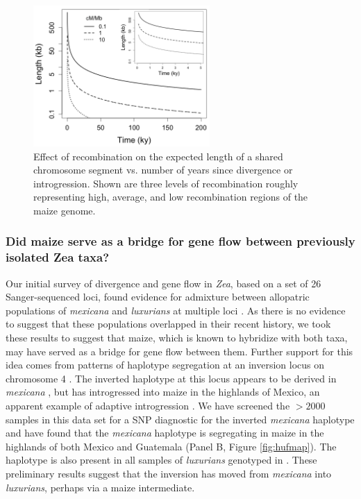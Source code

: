 \begin{figure}
  \centering
   \includegraphics[width=0.6\textwidth]{length_vs_time2}
    \caption{Effect of recombination on the expected length of a shared chromosome segment vs. number of years since divergence or introgression.  Shown are three levels of recombination roughly representing high, average, and low recombination regions of the maize genome.} 
\label{fig:length}
\end{figure}

\subsubsection{Did maize serve as a bridge for gene flow between previously isolated Zea taxa?}
\label{sss:bridge}

Our initial survey of divergence and gene flow in \emph{Zea}, based on a set of 26 Sanger-sequenced loci, found evidence for admixture between allopatric populations of \emph{mexicana} and \emph{luxurians} at multiple loci \citep{Ross-Ibarra2009a}. 
As there is no evidence to suggest that these populations overlapped in their recent history, we took these results to suggest that maize, which is known to hybridize with both taxa, may have served as a bridge for gene flow between them.
Further support for this idea comes from patterns of haplotype segregation at an inversion locus on chromosome 4 \citep[\emph{Inv4m};][]{Fang2012,Pyhajarvi2013,Hufford2013}. 
The inverted haplotype at this locus appears to be derived in \emph{mexicana} \citep{Pyhajarvi2013}, but has introgressed into maize in the highlands of Mexico, an apparent example of adaptive introgression \citep[Panel A, Figure \ref{fig:hufmap};][]{Hufford2013}.
We have screened the $>2000$ samples in this data set for a SNP diagnostic for the inverted \emph{mexicana} haplotype and have found that the \emph{mexicana} haplotype is segregating in maize in the highlands of both Mexico and Guatemala (Panel B, Figure \ref{fig:hufmap}).  The haplotype is also present in all samples of \emph{luxurians} genotyped in \citet{Fang2012}.
These preliminary results suggest that the inversion has moved from \emph{mexicana} into \emph{luxurians}, perhaps via a maize intermediate.


